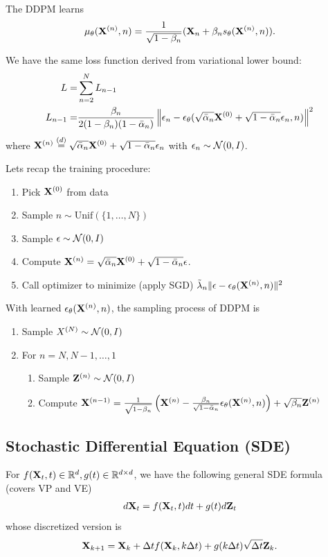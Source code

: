 \documentclass[11pt]{article}
\begin{document}
The DDPM learns
\begin{align}
    \mu_\theta ({\bf X}^{(n)}, n) = \frac{1}{\sqrt{1-\beta_n}} ({\bf X}_n + \beta_n s_\theta({\bf X}^{(n)}, n)).
\end{align}

We have the same loss function derived from variational lower bound:
\begin{align}
    L =& \sum_{n=2}^N L_{n-1}\\
    L_{n-1} =& \frac{\beta_n}{2(1-\beta_n)(1-\bar{\alpha}_n)} \left\|\epsilon_n - \epsilon_{\theta}(\sqrt{\bar{\alpha}_n} {\bf X}^{(0)} + \sqrt{1-\bar{\alpha}_n}\epsilon_n, n)\right\|^2
\end{align}
where ${\bf X}^{(n)} \stackrel{(d)}{=} \sqrt{\bar{\alpha}_n}{\bf X}^{(0)} + \sqrt{1-\bar{\alpha}_n} \epsilon_n$ with $\epsilon_n\sim{\cal N}(0, I)$.

Lets recap the training procedure:
\begin{enumerate}
    \item Pick ${\bf X}^{(0)}$ from data
    \item Sample $n\sim\mbox{Unif}(\{1, \dots, N\})$
    \item Sample $\epsilon\sim {\cal N}(0, I)$
    \item Compute ${\bf X}^{(n)} = \sqrt{\bar{\alpha}_n} {\bf X}^{(0)} + \sqrt{1-\bar{\alpha}_n} \epsilon$.
    \item Call optimizer to minimize (apply SGD) $\tilde{\lambda}_n \|\epsilon - \epsilon_\theta({\bf X}^{(n)}, n)\|^2$
\end{enumerate}
With learned $\epsilon_\theta({\bf X}^{(n)}, n)$, the sampling process of DDPM is 
\begin{enumerate}
    \item Sample $X^{(N)} \sim {\cal N}(0, I)$
    \item For $n= N, N-1, \dots, 1$
    \begin{enumerate}
        \item Sample ${\bf Z}^{(n)} \sim {\cal N}(0, I)$
        \item Compute ${\bf X}^{(n-1)} = \frac{1}{\sqrt{1-\beta_n}} \left({\bf X}^{(n)} - \frac{\beta_n}{\sqrt{1-\bar{\alpha}_n}}\epsilon_\theta({\bf X}^{(n)}, n)\right) + \sqrt{\beta_n} {\bf Z}^{(n)}$
    \end{enumerate}
\end{enumerate}


\subsection{Stochastic Differential Equation (SDE)}
For $f({\bf X}_t, t)\in\mathbb{R}^d, g(t) \in \mathbb{R}^{d\times d}$, we have the following general SDE formula (covers VP and VE)
\begin{align}
    d{\bf X}_t = f({\bf X}_t, t)dt + g(t) d{\bf Z}_t
\end{align}
whose discretized version is
\begin{align}
    {\bf X}_{k+1} = {\bf X}_k + \Delta t f({\bf X}_k, k\Delta t) + g(k\Delta t)\sqrt{\Delta t}{\bf Z}_k.
\end{align}
\end{document}
